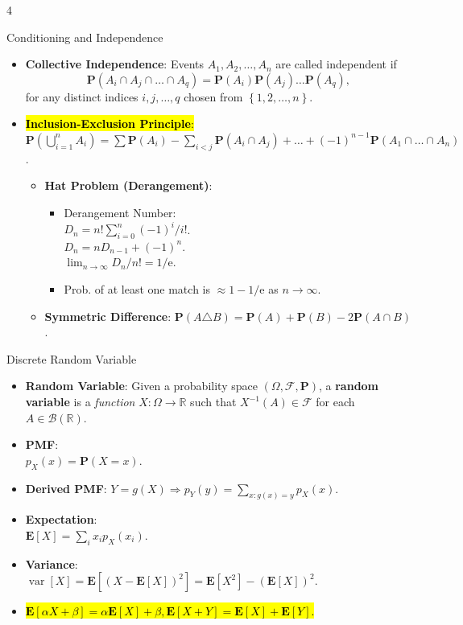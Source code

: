 \documentclass[landscape,a4paper]{article}
\renewcommand{\emph}[1]{\hl{#1}}
\newcommand{\e}{\mathrm{e}}
\newcommand{\PP}{\mathbf{P}}
\newcommand{\EE}{\mathbf{E}}
\newcommand{\var}{\operatorname{var}}
\begin{document}
\begin{multicols*}{4}
\begin{card}{Conditioning and Independence}
\begin{itemize}
			\item \textbf{Collective Independence}: Events $A_1,A_2,\dots, A_n$ are called independent if
			\[
			\PP(A_i\cap A_j\cap \dots\cap A_q)=\PP(A_i)\PP(A_j)\dots\PP(A_q),
			\]
			for any distinct indices $i,j,\dots,q$ chosen from $\left\{1,2,\dots,n\right\}$.
			\item \emph{\textbf{Inclusion-Exclusion Principle}:}
			$\PP\left(\bigcup_{i=1}^n A_i\right) = \sum \PP(A_i) - \sum_{i<j} \PP(A_i \cap A_j) + \dots + (-1)^{n-1} \PP(A_1 \cap \dots \cap A_n)$.
			\begin{itemize}
				\item \textbf{Hat Problem (Derangement)}: 
				\begin{itemize}
					\item Derangement Number:\\ $D_n=n!\sum_{i=0}^n(-1)^i/i!$.\\
					$D_n=nD_{n-1}+(-1)^n$.\\
					$\lim_{n\to\infty} D_n/n!=1/\e$.
					\item Prob. of at least one match is $\approx 1 - 1/\e$ as $n\to\infty$.
				\end{itemize}
				\item \textbf{Symmetric Difference}: $\PP(A \triangle B) = \PP(A) + \PP(B) - 2\PP(A \cap B)$.
			\end{itemize}
			\end{itemize}
		\end{card}
		\begin{card}{Discrete Random Variable}
			\begin{itemize}
				\item \textbf{Random Variable}: Given a probability space $(\Omega,\mathcal F,\PP)$, a \textbf{random variable} is a \textit{function} $X\colon \Omega\to \mathbb R$ such that $X^{-1}(A)\in\mathcal F$ for each $A\in\mathcal B(\mathbb R)$.
				\item \textbf{PMF}:\\ $p_X(x)=\PP(X=x)$.
				\item \textbf{Derived PMF}: $Y=g(X)\Rightarrow p_Y(y)=\sum_{x:g(x)=y}p_X(x)$.
				\item \textbf{Expectation}:\\ $\EE[X]=\sum_ix_ip_X(x_i)$.
				\item \textbf{Variance}:\\ $\var[X]=\EE\left[\left(X-\EE[X]\right)^2\right]=\EE[X^2]-\left(\EE[X]\right)^2$.
				\item \emph{$\EE[\alpha X+ \beta]=\alpha\EE[X]+\beta,\EE[X+Y]=\EE[X]+\EE[Y].$}

\end{itemize}
\end{card}
\end{multicols*}
\end{document}
